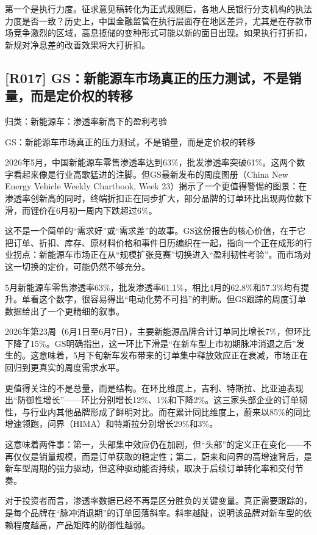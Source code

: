 \documentclass[11pt]{ctexart}
\begin{document}
第一个是执行力度。征求意见稿转化为正式规则后，各地人民银行分支机构的执法力度是否一致？历史上，中国金融监管在执行层面存在地区差异，尤其是在存款市场竞争激烈的区域，高息揽储的变种形式可能以新的面目出现。如果执行打折扣，新规对净息差的改善效果将大打折扣。

\subsection{[R017] GS：新能源车市场真正的压力测试，不是销量，而是定价权的转移}
{\small\color{refgray}归类：新能源车：渗透率新高下的盈利考验}

GS：新能源车市场真正的压力测试，不是销量，而是定价权的转移

2026年5月，中国新能源车零售渗透率达到63\%，批发渗透率突破61\%。这两个数字看起来像是行业高歌猛进的注脚。但GS最新发布的周度图册（China New Energy Vehicle Weekly Chartbook, Week 23）揭示了一个更值得警惕的图景：在渗透率创新高的同时，终端折扣正在同步扩大，部分品牌的订单环比出现两位数下滑，而锂价在6月初一周内下跌超过6\%。

这不是一个简单的“需求好”或“需求差”的故事。GS这份报告的核心价值，在于它把订单、折扣、库存、原材料价格和事件日历编织在一起，指向一个正在成形的行业拐点：新能源车市场正在从“规模扩张竞赛”切换进入“盈利韧性考验”。而市场对这一切换的定价，可能仍然不够充分。

5月新能源车零售渗透率63\%，批发渗透率61.1\%，相比4月的62.8\%和57.3\%均有提升。单看这个数字，很容易得出“电动化势不可挡”的判断。但GS跟踪的周度订单数据给出了一个更精细的叙事。

2026年第23周（6月1日至6月7日），主要新能源品牌合计订单同比增长7\%，但环比下降了15\%。GS明确指出，这一环比下滑是“在新车型上市初期脉冲消退之后”发生的。这意味着，5月下旬新车发布带来的订单集中释放效应正在衰减，市场正在回归到更真实的周度需求水平。

更值得关注的不是总量，而是结构。在环比维度上，吉利、特斯拉、比亚迪表现出“防御性增长”——环比分别增长12\%、1\%和下降2\%。这三家头部企业的订单韧性，与行业内其他品牌形成了鲜明对比。而在累计同比维度上，蔚来以85\%的同比增速领跑，问界（HIMA）和特斯拉分别增长29\%和3\%。

这意味着两件事：第一，头部集中效应仍在加剧，但“头部”的定义正在变化——不再仅仅是销量规模，而是订单获取的稳定性；第二，蔚来和问界的高增速背后，是新车型周期的强力驱动，但这种驱动能否持续，取决于后续订单转化率和交付节奏。

对于投资者而言，渗透率数据已经不再是区分胜负的关键变量。真正需要跟踪的，是每个品牌在“脉冲消退期”的订单回落斜率。斜率越陡，说明该品牌对新车型的依赖程度越高，产品矩阵的防御性越弱。
\end{document}
